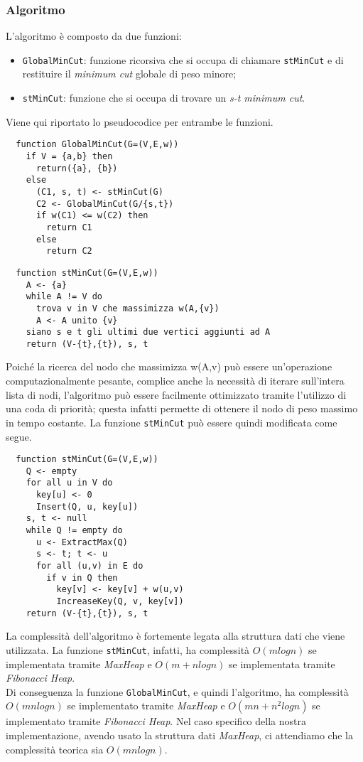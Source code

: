 \subsubsection{Algoritmo}

L'algoritmo è composto da due funzioni:
\begin{itemize}
  \item \texttt{GlobalMinCut}: funzione ricorsiva che si occupa di chiamare \texttt{stMinCut} e di restituire il \textit{minimum cut} globale di peso minore;
  \item \texttt{stMinCut}: funzione che si occupa di trovare un \textit{s-t minimum cut}.
\end{itemize}

Viene qui riportato lo pseudocodice per entrambe le funzioni.

\begin{verbatim}
  function GlobalMinCut(G=(V,E,w))
    if V = {a,b} then
      return({a}, {b})
    else
      (C1, s, t) <- stMinCut(G)
      C2 <- GlobalMinCut(G/{s,t})
      if w(C1) <= w(C2) then
        return C1
      else
        return C2
\end{verbatim}

\begin{verbatim}
  function stMinCut(G=(V,E,w))
    A <- {a}
    while A != V do
      trova v in V che massimizza w(A,{v})
      A <- A unito {v}
    siano s e t gli ultimi due vertici aggiunti ad A
    return (V-{t},{t}), s, t
\end{verbatim}

Poiché la ricerca del nodo che massimizza w(A,{v}) può essere un'operazione computazionalmente pesante, complice anche la necessità di iterare sull'intera lista di nodi, l'algoritmo può essere facilmente ottimizzato tramite l'utilizzo di una coda di priorità; questa infatti permette di ottenere il nodo di peso massimo in tempo costante. La funzione \texttt{stMinCut} può essere quindi modificata come segue.

\begin{verbatim}
  function stMinCut(G=(V,E,w))
    Q <- empty
    for all u in V do
      key[u] <- 0
      Insert(Q, u, key[u])
    s, t <- null
    while Q != empty do
      u <- ExtractMax(Q)
      s <- t; t <- u
      for all (u,v) in E do
        if v in Q then
          key[v] <- key[v] + w(u,v)
          IncreaseKey(Q, v, key[v])
    return (V-{t},{t}), s, t
\end{verbatim}

La complessità dell'algoritmo è fortemente legata alla struttura dati che viene utilizzata. La funzione \texttt{stMinCut}, infatti, ha complessità $O(mlogn)$ se implementata tramite \textit{MaxHeap} e $O(m+nlogn)$ se implementata tramite \textit{Fibonacci Heap}. \\
Di conseguenza la funzione \texttt{GlobalMinCut}, e quindi l'algoritmo, ha complessità $O(mnlogn)$ se implementato tramite \textit{MaxHeap} e $O(mn+n^2 logn)$ se implementato tramite \textit{Fibonacci Heap}. Nel caso specifico della nostra implementazione, avendo usato la struttura dati \textit{MaxHeap}, ci attendiamo che la complessità teorica sia $O(mnlogn)$.

